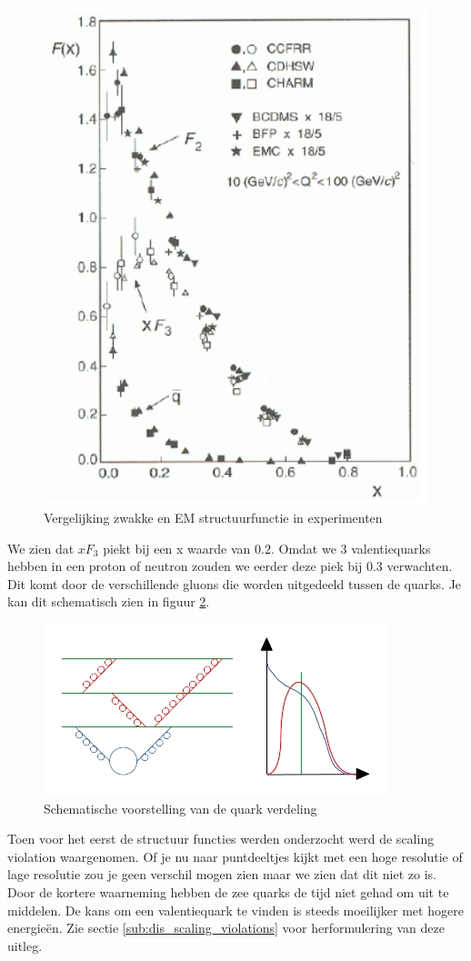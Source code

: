 \documentclass[../main.tex]{subfiles}
\begin{document}
\begin{figure}[h]
    \centering
    \includegraphics[width=0.4\linewidth]{DIS_nucleon_structuur_pdf/neutr_scat_exp.png}
    \caption{Vergelijking zwakke en EM structuurfunctie in experimenten}%
    \label{fig:neutr_scat_exp}
\end{figure}

We zien dat $xF_3$ piekt bij een x waarde van $0.2$. Omdat we 3 valentiequarks hebben in een proton of neutron zouden we eerder deze piek bij $0.3$ verwachten. Dit komt door de verschillende gluons die worden uitgedeeld tussen de quarks. Je kan dit schematisch zien in figuur \ref{fig:valance_quark_dist}.
 
\begin{figure}[h]
    \centering
    \includegraphics[width=0.8\linewidth]{DIS_nucleon_structuur_pdf/valance_quark_dist.jpg}
    \caption{Schematische voorstelling van de quark verdeling}%
    \label{fig:valance_quark_dist}
\end{figure}

Toen voor het eerst de structuur functies werden onderzocht werd de scaling violation waargenomen. Of je nu naar puntdeeltjes kijkt met een hoge resolutie of lage resolutie zou je geen verschil mogen zien maar we zien dat dit niet zo is. Door de kortere waarneming hebben de zee quarks de tijd niet gehad om uit te middelen. De kans om een valentiequark te vinden is steeds moeilijker met hogere energieën. Zie sectie \ref{sub:dis_scaling_violations} voor herformulering van deze uitleg.
\end{document}

